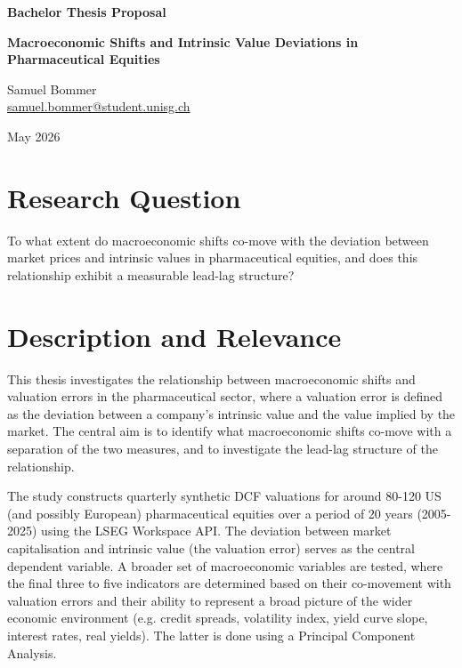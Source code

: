 \documentclass[11pt, a4paper]{article}
\begin{document}
\begin{center}
    \vspace*{1em} 
    {\large \bfseries Bachelor Thesis Proposal\par}
    \vspace{1em}
    {\Large \bfseries Macroeconomic Shifts and Intrinsic Value Deviations in Pharmaceutical Equities\par}
    
    \vspace{1em}
    
    {\large Samuel Bommer \\
    \href{mailto:samuel.bommer@student.unisg.ch}{samuel.bommer@student.unisg.ch}\par}
    
    \vspace{1em} 
    
    {\large May 2026\par}
    
    \vspace{2em}
\end{center}

\vspace{1em}

\section{Research Question}
To what extent do macroeconomic shifts co-move with the deviation between market prices and intrinsic values in pharmaceutical equities, and does this relationship exhibit a measurable lead-lag structure?

\section{Description and Relevance}
This thesis investigates the relationship between macroeconomic shifts and valuation errors in the pharmaceutical sector, where a valuation error is defined as the deviation between a company's intrinsic value and the value implied by the market. The central aim is to identify what macroeconomic shifts co-move with a separation of the two measures, and to investigate the lead-lag structure of the relationship.

The study constructs quarterly synthetic DCF valuations for around 80-120 US (and possibly European) pharmaceutical equities over a period of 20 years (2005-2025) using the LSEG Workspace API. The deviation between market capitalisation and intrinsic value (the valuation error) serves as the central dependent variable. A broader set of macroeconomic variables are tested, where the final three to five indicators are determined based on their co-movement with valuation errors and their ability to represent a broad picture of the wider economic environment (e.g. credit spreads, volatility index, yield curve slope, interest rates, real yields). The latter is done using a Principal Component Analysis.
\end{document}
